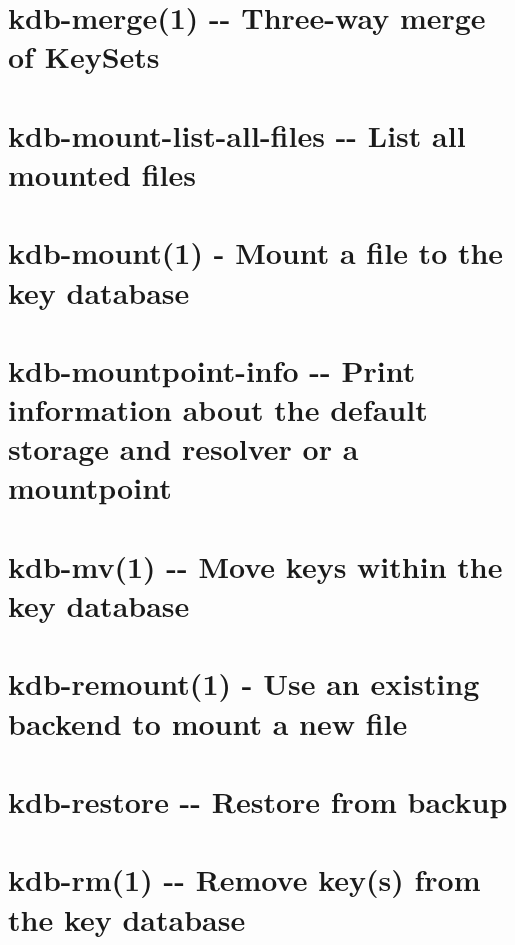 \documentclass[twoside]{book}
\newcommand{\+}{\discretionary{\mbox{\scriptsize$\hookleftarrow$}}{}{}}
\begin{document}
\chapter{kdb-\/merge(1) -\/-\/ Three-\/way merge of Key\+Sets}
\label{md_doc_help_kdb-merge}

\chapter{kdb-\/mount-\/list-\/all-\/files -\/-\/ List all mounted files}
\label{md_doc_help_kdb-mount-list-all-files}

\chapter{kdb-\/mount(1) -\/ Mount a file to the key database}
\label{md_doc_help_kdb-mount}

\chapter{kdb-\/mountpoint-\/info -\/-\/ Print information about the default storage and resolver or a mountpoint}
\label{md_doc_help_kdb-mountpoint-info}

\chapter{kdb-\/mv(1) -\/-\/ Move keys within the key database}
\label{md_doc_help_kdb-mv}

\chapter{kdb-\/remount(1) -\/ Use an existing backend to mount a new file}
\label{md_doc_help_kdb-remount}

\chapter{kdb-\/restore -\/-\/ Restore from backup}
\label{md_doc_help_kdb-restore}

\chapter{kdb-\/rm(1) -\/-\/ Remove key(s) from the key database}
\label{md_doc_help_kdb-rm}

\end{document}
